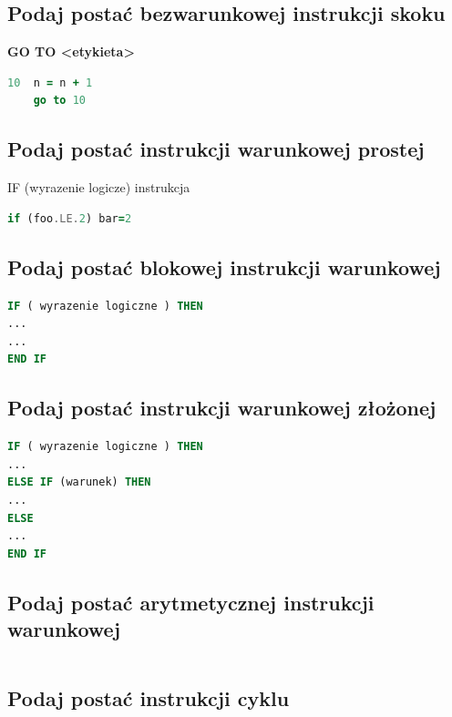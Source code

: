 \subsection{Podaj postać bezwarunkowej instrukcji skoku}
\textbf{GO TO <etykieta>}
\begin{lstlisting}[language=Fortran, caption=cos]
10	n = n + 1
	go to 10
\end{lstlisting}

\subsection{Podaj postać instrukcji warunkowej prostej}
IF (wyrazenie logicze) instrukcja
\begin{lstlisting}[language=Fortran, caption=cos]
	if (foo.LE.2) bar=2
\end{lstlisting}

\subsection{Podaj postać blokowej instrukcji warunkowej}

\begin{lstlisting}[language=Fortran, caption=cos]
IF ( wyrazenie logiczne ) THEN
...
...
END IF
\end{lstlisting}

\subsection{Podaj postać instrukcji warunkowej złożonej}

\begin{lstlisting}[language=Fortran, caption=cos]
IF ( wyrazenie logiczne ) THEN
...
ELSE IF (warunek) THEN
...
ELSE
...
END IF
\end{lstlisting}

\subsection{Podaj postać arytmetycznej instrukcji warunkowej}

\begin{lstlisting}[language=Fortran, caption=cos]

\end{lstlisting}

\subsection{Podaj postać instrukcji cyklu}

